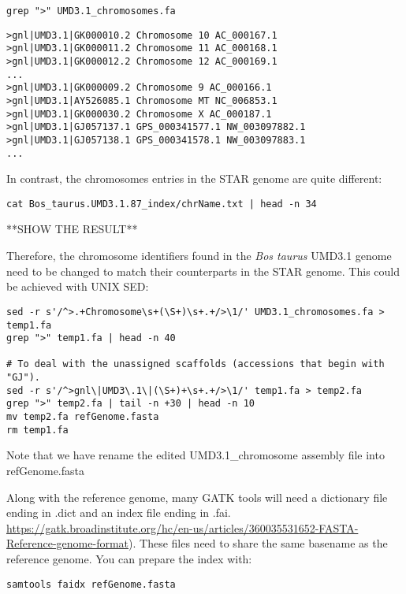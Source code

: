 \begin{verbatim}
grep ">" UMD3.1_chromosomes.fa
\end{verbatim}


\begin{verbatim}
>gnl|UMD3.1|GK000010.2 Chromosome 10 AC_000167.1
>gnl|UMD3.1|GK000011.2 Chromosome 11 AC_000168.1
>gnl|UMD3.1|GK000012.2 Chromosome 12 AC_000169.1
...
>gnl|UMD3.1|GK000009.2 Chromosome 9 AC_000166.1
>gnl|UMD3.1|AY526085.1 Chromosome MT NC_006853.1
>gnl|UMD3.1|GK000030.2 Chromosome X AC_000187.1
>gnl|UMD3.1|GJ057137.1 GPS_000341577.1 NW_003097882.1
>gnl|UMD3.1|GJ057138.1 GPS_000341578.1 NW_003097883.1
...
\end{verbatim}

In contrast, the chromosomes entries in the STAR genome are quite different:

\begin{verbatim}
cat Bos_taurus.UMD3.1.87_index/chrName.txt | head -n 34
\end{verbatim}

**SHOW THE RESULT**

Therefore, the chromosome identifiers found in the \textit{Bos taurus} UMD3.1 genome need to be changed to match their counterparts in the STAR genome. This could be achieved with UNIX SED:

\begin{verbatim}
sed -r s'/^>.+Chromosome\s+(\S+)\s+.+/>\1/' UMD3.1_chromosomes.fa > temp1.fa
grep ">" temp1.fa | head -n 40

# To deal with the unassigned scaffolds (accessions that begin with "GJ").
sed -r s'/^>gnl\|UMD3\.1\|(\S+)+\s+.+/>\1/' temp1.fa > temp2.fa
grep ">" temp2.fa | tail -n +30 | head -n 10
mv temp2.fa refGenome.fasta
rm temp1.fa
\end{verbatim}

Note that we have rename the edited UMD3.1\_chromosome assembly file into refGenome.fasta

Along with the reference genome, many GATK tools will need a dictionary file ending in .dict and an index file ending in .fai.\href{https://gatk.broadinstitute.org/hc/en-us/articles/360035531652-FASTA-Reference-genome-format}{ https://gatk.broadinstitute.org/hc/en-us/articles/360035531652-FASTA-Reference-genome-format}). These files need to share the same basename as the reference genome. You can prepare the index with:

\begin{verbatim}
samtools faidx refGenome.fasta
\end{verbatim}

